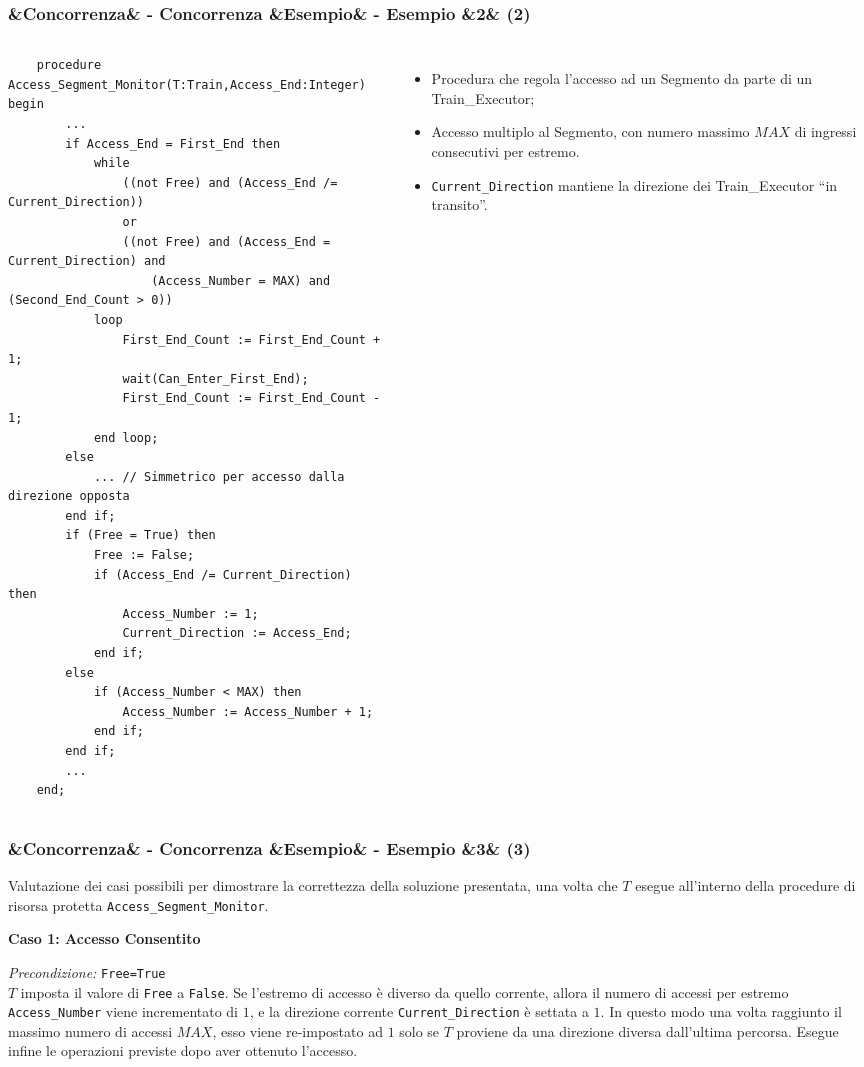 \documentclass[slidestop,compress,blackandwhite]{beamer}
\newcommand{\ttt}[1]{\texttt{#1}}
\newcommand{\ii}[1]{\textit{#1}}
\newcommand{\cm}[1]{\vspace{#1cm}}
\newcommand{\describe}[2]{
	\textbf{#1}\\
	\begin{addmargin}[2em]{0em}
		#2
	\end{addmargin}
}
\newcommand{\newtitle}[4]{
	#1 
	\ifx&#2&%
	\else
  		\large- #2
	\fi
	\ifx&#3&%
	\else
  		\normalsize- #3
	\fi
	\ifx&#4&%
	\else
  		\normalsize (#4)
	\fi
}
\newcommand{\newframe}[5]{
	\begin{frame}
		\frametitle{\newtitle{#1}{#2}{#3}{#4}}
		#5
	\end{frame}
}
\newcommand{\myitemize}[1]{
	\begin{itemize}\itemsep4pt
	#1
	\end{itemize}
}
\begin{document}
	\begin{frame}[fragile]
	\frametitle{\newtitle{}{Concorrenza}{Esempio}{2}}
	\begin{columns}
	\vspace{-1.1cm}
	\tiny\begin{verbatim}
    procedure Access_Segment_Monitor(T:Train,Access_End:Integer) begin
        ...
        if Access_End = First_End then
            while 
                ((not Free) and (Access_End /= Current_Direction)) 
                or
                ((not Free) and (Access_End = Current_Direction) and 
                    (Access_Number = MAX) and (Second_End_Count > 0)) 
            loop
                First_End_Count := First_End_Count + 1;
                wait(Can_Enter_First_End);
                First_End_Count := First_End_Count - 1;
            end loop;
        else
            ... // Simmetrico per accesso dalla direzione opposta
        end if;
        if (Free = True) then
            Free := False;
            if (Access_End /= Current_Direction) then
                Access_Number := 1;
                Current_Direction := Access_End;
            end if;
        else
            if (Access_Number < MAX) then
                Access_Number := Access_Number + 1;
            end if;
        end if;
        ...
    end;
\end{verbatim}
		\footnotesize
		\myitemize{
			\item Procedura che regola l'accesso ad un Segmento da parte di un Train\_Executor;
			\item Accesso multiplo al Segmento, con numero massimo $MAX$ di ingressi consecutivi per estremo.
			\item \ttt{Current\_Direction} mantiene la direzione dei Train\_Executor ``in transito''.
		}
	\end{columns}
	\end{frame}

	
	\newframe{}{Concorrenza}{Esempio}{3}{
		\footnotesize
		\cm{0.5}
		\justifying Valutazione dei casi possibili per dimostrare la correttezza della soluzione presentata, una volta che $T$ esegue all'interno della procedure di risorsa protetta \ttt{Access\_Segment\_Monitor}.\\
		\cm{0.3}
		\describe{\footnotesize Caso 1: Accesso Consentito}{
			\footnotesize
			\justifying
			\ii{Precondizione:} \ttt{Free=True}\\
			$T$ imposta il valore di \ttt{Free} a \ttt{False}. Se l'estremo di accesso è diverso da quello corrente, allora il numero di accessi per estremo \ttt{Access\_Number} viene incrementato di $1$, e la direzione corrente \ttt{Current\_Direction} è settata a $1$. In questo modo una volta raggiunto il massimo numero di accessi $MAX$, esso viene re-impostato ad $1$ solo se $T$ proviene da una direzione diversa dall'ultima percorsa. Esegue infine le operazioni previste dopo aver ottenuto l'accesso.
		}
	}
	
\end{document}
